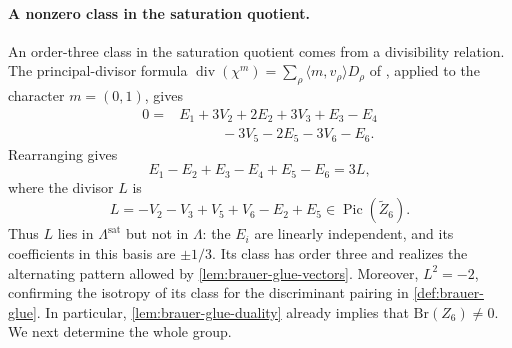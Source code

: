 \documentclass[11pt]{article}
\theoremstyle{plain}
\theoremstyle{definition}
\theoremstyle{remark}
\newcommand{\Pic}{\operatorname{Pic}}
\newcommand{\Br}{\mathrm{Br}}
\begin{document}
\paragraph{A nonzero class in the saturation quotient.}
An order-three class in the saturation quotient comes from a divisibility relation. The principal-divisor
formula
\(\operatorname{div}(\chi^m)=\sum_\rho\langle m,v_\rho\rangle D_\rho\)
of \cite[Theorem~4.1.3]{CoxLittleSchenck2011}, applied to the character
\(m=(0,1)\), gives
\[
\begin{aligned}
0={}&E_1+3V_2+2E_2+3V_3+E_3-E_4\\
&\hspace{3em}-3V_5-2E_5-3V_6-E_6.
\end{aligned}
\]
Rearranging gives
\begin{equation}\label{eq:brauer-six-glue}
E_1-E_2+E_3-E_4+E_5-E_6=3L,
\end{equation}
where the divisor \(L\) is
\[
L=-V_2-V_3+V_5+V_6-E_2+E_5
\in\Pic(\widetilde Z_6).
\]
Thus \(L\) lies in \(\Lambda^{\mathrm{sat}}\) but not in \(\Lambda\):
the \(E_i\) are linearly independent, and its coefficients in this basis
are \(\pm1/3\). Its class has order three and realizes the alternating
pattern allowed by \cref{lem:brauer-glue-vectors}.
Moreover, \(L^2=-2\), confirming the isotropy
of its class for the discriminant pairing in
\cref{def:brauer-glue}.
In particular, \cref{lem:brauer-glue-duality} already implies that
\(\Br(Z_6)\ne0\). We next determine the whole group.
\end{document}
